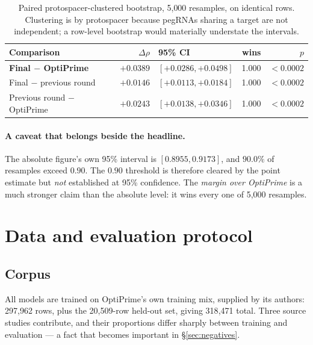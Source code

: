 \documentclass[11pt]{article}
\begin{document}
\begin{table}[H]
\centering
\caption{Paired protospacer-clustered bootstrap, 5{,}000 resamples, on identical rows.
Clustering is by protospacer because pegRNAs sharing a target are not independent; a
row-level bootstrap would materially understate the intervals.}
\label{tab:boot}
\begin{tabular}{lrlrr}
\toprule
Comparison & $\Delta\rho$ & 95\% CI & wins & $p$ \\
\midrule
\textbf{Final $-$ OptiPrime} & $\mathbf{+0.0389}$ & $[+0.0286, +0.0498]$ & 1.000 & $<0.0002$ \\
Final $-$ previous round & $+0.0146$ & $[+0.0113, +0.0184]$ & 1.000 & $<0.0002$ \\
Previous round $-$ OptiPrime & $+0.0243$ & $[+0.0138, +0.0346]$ & 1.000 & $<0.0002$ \\
\bottomrule
\end{tabular}
\end{table}

\paragraph{A caveat that belongs beside the headline.}
The absolute figure's own 95\% interval is $[0.8955, 0.9173]$, and $90.0\%$ of
resamples exceed $0.90$. The $0.90$ threshold is therefore cleared by the point
estimate but \emph{not} established at 95\% confidence. The \emph{margin over
OptiPrime} is a much stronger claim than the absolute level: it wins every one of
5{,}000 resamples.

\section{Data and evaluation protocol}

\subsection{Corpus}

All models are trained on OptiPrime's own training mix, supplied by its authors:
297{,}962 rows, plus the 20{,}509-row held-out set, giving 318{,}471 total. Three
source studies contribute, and their proportions differ sharply between training and
evaluation --- a fact that becomes important in \S\ref{sec:negatives}.
\end{document}
